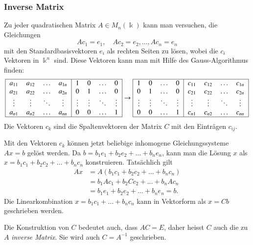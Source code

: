 \subsubsection{Inverse Matrix}
Zu jeder quadratischen Matrix $A\in M_n(\Bbbk)$ kann man versuchen, die
Gleichungen
\[
Ac_1 = e_1,\quad Ac_2 = e_2, \dots, Ac_n = e_n
\]
mit den Standardbasisvektoren $e_i$ als rechten Seiten zu lösen, wobei
die $c_i$ Vektoren in $\Bbbk^n$ sind.
Diese Vektoren kann man mit Hilfe des Gauss-Algorithmus finden:
\[
\begin{tabular}{|>{$}c<{$}>{$}c<{$}>{$}c<{$}>{$}c<{$}|>{$}c<{$}>{$}c<{$}>{$}c<{$}>{$}c<{$}|}
\hline
a_{11}&a_{12}&\dots &a_{1n}&1     &0     &\dots &0     \\
a_{21}&a_{22}&\dots &a_{2n}&0     &1     &\dots &0     \\
\vdots&\vdots&\ddots&\vdots&\vdots&\vdots&\ddots&\vdots\\
a_{n1}&a_{n2}&\dots &a_{nn}&0     &0     &\dots &1     \\
\hline
\end{tabular}
\rightarrow
\begin{tabular}{|>{$}c<{$}>{$}c<{$}>{$}c<{$}>{$}c<{$}|>{$}c<{$}>{$}c<{$}>{$}c<{$}>{$}c<{$}|}
\hline
1     &0     &\dots &0     &c_{11}&c_{12}&\dots &c_{1n}\\
0     &1     &\dots &0     &c_{21}&c_{22}&\dots &c_{2n}\\
\vdots&\vdots&\ddots&\vdots&\vdots&\vdots&\ddots&\vdots\\
0     &0     &\dots &1     &c_{n1}&c_{n2}&\dots &c_{nn}\\
\hline
\end{tabular}
\]
Die Vektoren $c_k$ sind die Spaltenvektoren der Matrix $C$ mit den
Einträgen $c_{ij}$.

Mit den Vektoren $c_k$ können jetzt beliebige inhomogene Gleichungssysteme
$Ax=b$ gelöst werden.
Da $b = b_1e_1 + b_2e_2 + \dots + b_ne_n$, kann man die Lösung $x$ als
$x = b_1c_1+b_2c_2+\dots+b_nc_n$ konstruieren.
Tatsächlich gilt
\begin{align*}
Ax
&= 
A( b_1c_1+b_2c_2+\dots+b_nc_n)
\\
&=
b_1Ac_1 + b_2Cc_2 + \dots + b_nAc_n
\\
&=
b_1e_1 + b_2e_2 + \dots + b_ne_n
=
b.
\end{align*}
Die Linearkombination $x=b_1c_1+\dots+b_nc_n$ kann in Vektorform als $x=Cb$
geschrieben werden.

Die Konstruktion von $C$ bedeutet auch, dass $AC=E$, daher heisst $C$ auch
die zu $A$ {\em inverse Matrix}.
Sie wird auch $C=A^{-1}$ geschrieben.

